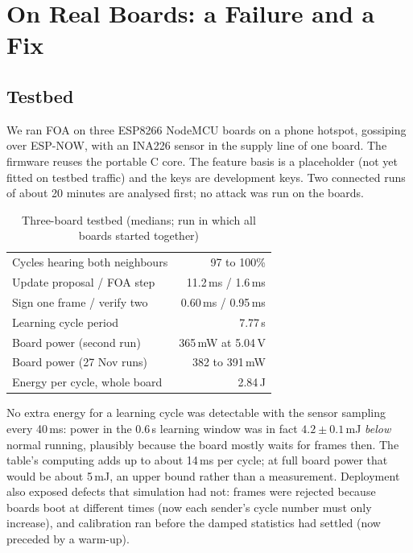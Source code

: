 \section{On Real Boards: a Failure and a Fix}\label{sec:hw}

\subsection{Testbed}
We ran FOA on three ESP8266 NodeMCU boards on a phone hotspot, gossiping over ESP-NOW, with an INA226
sensor in the supply line of one board. The firmware reuses the portable C core. The feature basis is a
placeholder (not yet fitted on testbed traffic) and the keys are development keys. Two connected runs of about 20 minutes are analysed first; no attack was run on the boards.

\begin{table}[t]
\centering
\caption{Three-board testbed (medians; run in which all boards started together)}
\label{tab:hw}
\small
\begin{tabular}{@{}lr@{}}
\toprule
Cycles hearing both neighbours & 97 to 100\% \\
Update proposal / FOA step & 11.2\,ms / 1.6\,ms \\
Sign one frame / verify two & 0.60\,ms / 0.95\,ms \\
Learning cycle period & 7.77\,s \\
Board power (second run) & 365\,mW at 5.04\,V \\
Board power (27 Nov runs) & 382 to 391\,mW \\
Energy per cycle, whole board & 2.84\,J \\
\bottomrule
\end{tabular}
\end{table}

No extra energy for a learning cycle was detectable with the sensor sampling every 40\,ms: power in the
0.6\,s learning window was in fact $4.2\pm0.1$\,mJ \emph{below} normal running, plausibly because the
board mostly waits for frames then. The table's computing adds up to about 14\,ms per cycle; at
full board power that would be about 5\,mJ, an upper bound rather than a measurement. Deployment also exposed defects that simulation had not: frames were
rejected because boards boot at different times (now each sender's cycle number must only increase), and
calibration ran before the damped statistics had settled (now preceded by a warm-up).

